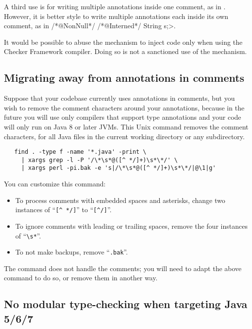 A third use is for writing multiple annotations inside one
comment, as in .
However, it is better style to write multiple annotations each
inside its own comment, as in \</*@NonNull*/ /*@Interned*/ String s;>.

It would be possible to abuse the  mechanism to inject
code only when using
the Checker Framework compiler.  Doing so is not a sanctioned use of the
mechanism.


\subsection{Migrating away from annotations in comments\label{uncommenting-annotations}}

Suppose that your codebase currently uses annotations in comments, but you
wish to remove the comment characters around your annotations, because in
the future you will use only compilers that support type annotations and
your code will only run on Java 8 or later JVMs.
This Unix command removes
the comment characters, for all Java files in the current
working directory or any subdirectory.

\begin{Verbatim}
   find . -type f -name '*.java' -print \
     | xargs grep -l -P '/\*\s*@([^ */]+)\s*\*/' \
     | xargs perl -pi.bak -e 's|/\*\s*@([^ */]+)\s*\*/|@\1|g'
\end{Verbatim}

You can customize this command:
\begin{itemize}
\item
To process comments with embedded spaces and asterisks, change
two instances of ``\verb|[^ */]|'' to ``\verb|[^/]|''.
\item
To ignore comments with leading or trailing spaces, remove the four
instances of ``\verb|\s*|''.
\item
  To not make backups, remove ``\verb|.bak|''.
\end{itemize}

The command does not handle the \code{>>>} comments; you will need to
adapt the above command to do so, or remove them in another way.


\subsection{No modular type-checking when targeting Java 5/6/7\label{no-modular-type-checking-java7-jvm}}

